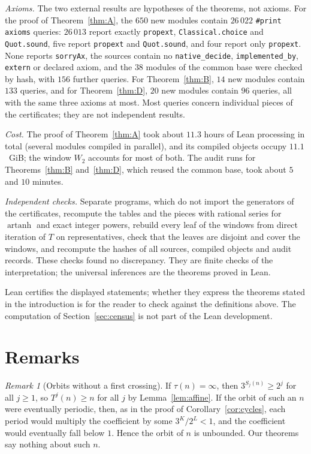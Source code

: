 \documentclass[11pt]{amsart}
\theoremstyle{definition}
\theoremstyle{remark}
\newtheorem{remark}[theorem]{Remark}
\begin{document}
\emph{Axioms.} The two external results are hypotheses of the theorems, not axioms. For the proof of Theorem~\ref{thm:A}, the $650$ new modules contain $26\,022$ \texttt{\#print axioms} queries: $26\,013$ report exactly \texttt{propext}, \texttt{Classical.choice} and \texttt{Quot.sound}, five report \texttt{propext} and \texttt{Quot.sound}, and four report only \texttt{propext}. None reports \texttt{sorryAx}, the sources contain no \texttt{native\_decide}, \texttt{implemented\_by}, \texttt{extern} or declared axiom, and the $38$ modules of the common base were checked by hash, with $156$ further queries. For Theorem~\ref{thm:B}, $14$ new modules contain $133$ queries, and for Theorem~\ref{thm:D}, $20$ new modules contain $96$ queries, all with the same three axioms at most. Most queries concern individual pieces of the certificates; they are not independent results.

\emph{Cost.} The proof of Theorem~\ref{thm:A} took about $11.3$ hours of Lean processing in total (several modules compiled in parallel), and its compiled objects occupy $11.1$~GiB; the window $W_2$ accounts for most of both. The audit runs for Theorems~\ref{thm:B} and~\ref{thm:D}, which reused the common base, took about $5$ and $10$ minutes.

\emph{Independent checks.} Separate programs, which do not import the generators of the certificates, recompute the tables and the pieces with rational series for $\operatorname{artanh}$ and exact integer powers, rebuild every leaf of the windows from direct iteration of $T$ on representatives, check that the leaves are disjoint and cover the windows, and recompute the hashes of all sources, compiled objects and audit records. These checks found no discrepancy. They are finite checks of the interpretation; the universal inferences are the theorems proved in Lean.

Lean certifies the displayed statements; whether they express the theorems stated in the introduction is for the reader to check against the definitions above. The computation of Section~\ref{sec:census} is not part of the Lean development.

\section{Remarks}\label{sec:remarks}

\begin{remark}[Orbits without a first crossing]\label{rem:infinite}
If $\tau(n)=\infty$, then $3^{S_j(n)}\ge2^{j}$ for all $j\ge1$, so $T^{j}(n)\ge n$ for all $j$ by Lemma~\ref{lem:affine}. If the orbit of such an $n$ were eventually periodic, then, as in the proof of Corollary~\ref{cor:cycles}, each period would multiply the coefficient by some $3^{K}/2^{L}<1$, and the coefficient would eventually fall below $1$. Hence the orbit of $n$ is unbounded. Our theorems say nothing about such $n$.
\end{remark}
\end{document}
